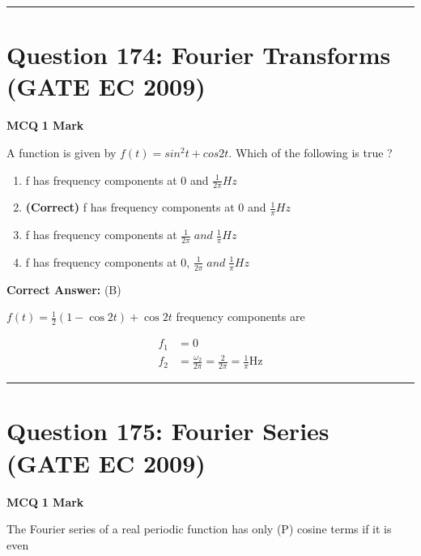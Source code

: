 \documentclass[11pt,a4paper]{article}
\begin{document}
\vspace{1.5em}
\hrule
\vspace{1.5em}

\section*{Question 174: Fourier Transforms (GATE EC 2009)}
\noindent \textbf{\color{primary}MCQ} \hfill \textbf{\color{secondary}1 Mark}


\noindent A function is given by $f(t)=sin^{2}t+cos2t$. Which of the following is true ?


\begin{enumerate}[label=(\Alph*)]
    \item f has frequency components at 0 and $\frac{1}{2\pi } Hz$
    \item \textbf{(Correct)} f has frequency components at 0 and $\frac{1}{\pi } Hz$
    \item f has frequency components at $\frac{1}{2\pi } \; and \; \frac{1}{\pi}Hz$
    \item f has frequency components at 0, $\frac{1}{2\pi } \; and \; \frac{1}{\pi}Hz$
\end{enumerate}

\noindent \textbf{Correct Answer:} (B)

\begin{tcolorbox}[solbox, title=Detailed Solution -- Question 174]
$f(t)=\frac{1}{2}(1-\cos 2 t)+\cos 2 t$
 frequency components are

\[
\begin{aligned} f_{1}&=0 \\ f_{2}&=\frac{\omega_{2}}{2 \pi}=\frac{2}{2 \pi}=\frac{1}{\pi} \mathrm{Hz} \end{aligned}
\]
\end{tcolorbox}

\vspace{1.5em}
\hrule
\vspace{1.5em}

\section*{Question 175: Fourier Series (GATE EC 2009)}
\noindent \textbf{\color{primary}MCQ} \hfill \textbf{\color{secondary}1 Mark}


\noindent The Fourier series of a real periodic function has only 
 (P) cosine terms if it is even 
\end{document}
